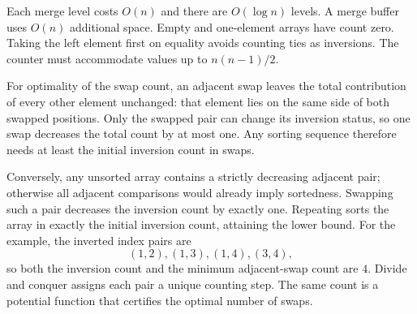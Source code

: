 Each merge level costs $O(n)$ and there are $O(\log n)$ levels. A merge buffer uses $O(n)$ additional space. Empty and one-element arrays have count zero. Taking the left element first on equality avoids counting ties as inversions. The counter must accommodate values up to $n(n-1)/2$.

For optimality of the swap count, an adjacent swap leaves the total contribution of every other element unchanged: that element lies on the same side of both swapped positions. Only the swapped pair can change its inversion status, so one swap decreases the total count by at most one. Any sorting sequence therefore needs at least the initial inversion count in swaps.

Conversely, any unsorted array contains a strictly decreasing adjacent pair; otherwise all adjacent comparisons would already imply sortedness. Swapping such a pair decreases the inversion count by exactly one. Repeating sorts the array in exactly the initial inversion count, attaining the lower bound. For the example, the inverted index pairs are
\[
(1,2),(1,3),(1,4),(3,4),
\]
so both the inversion count and the minimum adjacent-swap count are $4$.
\insight Divide and conquer assigns each pair a unique counting step. The same count is a potential function that certifies the optimal number of swaps.
